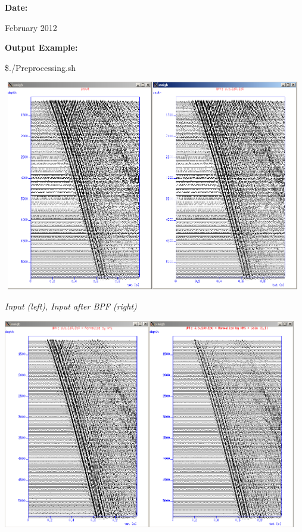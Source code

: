\documentclass{article}
\begin{document}
\vspace{4pt}
\leftskip=0pt
\textbf{Date:}

\vspace{4pt}
\leftskip=18pt
February 2012 

\vspace{40pt}
\leftskip=0pt
\textbf{Output Example:}

\vspace{4pt}
\$./Preprocessing.sh

\vspace{16pt}
\begin{center}
\includegraphics[width=372pt, height=261pt, keepaspectratio=true]{LatihanVSPsu-fig007.png}

\vspace{16pt}
\textit{Input (left), Input after BPF (right)}

\vspace{16pt}
\includegraphics[width=364pt, height=260pt, keepaspectratio=true]{LatihanVSPsu-fig008.png}


\end{center}
\end{document}
